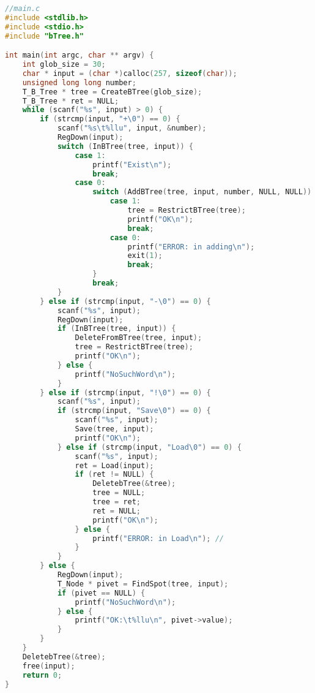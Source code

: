 \begin{lstlisting}[language=C]
//main.c
#include <stdlib.h>
#include <stdio.h>
#include "bTree.h"

int main(int argc, char ** argv) {
    int glob_size = 30;
    char * input = (char *)calloc(257, sizeof(char));
    unsigned long long number;
    T_B_Tree * tree = CreateBTree(glob_size);
    T_B_Tree * ret = NULL;
    while (scanf("%s", input) > 0) {
        if (strcmp(input, "+\0") == 0) {
            scanf("%s\t%llu", input, &number);
            RegDown(input);
            switch (InBTree(tree, input)) {
                case 1:
                    printf("Exist\n");
                    break;
                case 0:
                    switch (AddBTree(tree, input, number, NULL, NULL)) {
                        case 1:
                            tree = RestrictBTree(tree);
                            printf("OK\n");
                            break;
                        case 0:
                            printf("ERROR: in adding\n");
                            exit(1);
                            break;
                    }
                    break;
            }
        } else if (strcmp(input, "-\0") == 0) {
            scanf("%s", input);
            RegDown(input);
            if (InBTree(tree, input)) {
                DeleteFromBTree(tree, input);
                tree = RestrictBTree(tree);
                printf("OK\n");
            } else {
                printf("NoSuchWord\n");
            }
        } else if (strcmp(input, "!\0") == 0) {
            scanf("%s", input);
            if (strcmp(input, "Save\0") == 0) {
                scanf("%s", input);
                Save(tree, input);
                printf("OK\n");
            } else if (strcmp(input, "Load\0") == 0) {
                scanf("%s", input);
                ret = Load(input);
                if (ret != NULL) {
                    DeletebTree(&tree);
                    tree = NULL;
                    tree = ret;
                    ret = NULL;
                    printf("OK\n");
                } else {
                    printf("ERROR: in Load\n"); //
                }
            }
        } else {
            RegDown(input);
            T_Node * pivet = FindSpot(tree, input);
            if (pivet == NULL) {
                printf("NoSuchWord\n");
            } else {
                printf("OK:\t%llu\n", pivet->value);
            }
        }
    }
    DeletebTree(&tree);
    free(input);
    return 0;
}
\end{lstlisting}

